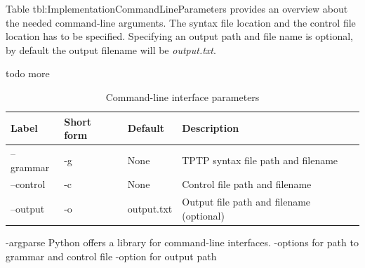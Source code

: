 Table \ac{tbl:ImplementationCommandLineParameters} provides an overview about the needed command-line arguments. The syntax file location and the control file location has to be specified. Specifying an output path and file name is optional, by default the output filename will be \textit{output.txt}.

todo more
\begin{table}[H]
\centering
\caption{Command-line interface parameters}
\begin{adjustbox}{width=1\textwidth, center=\textwidth}
\renewcommand{\arraystretch}{2}
\begin{tabular}{llll}
\textbf{Label} & \textbf{Short form} & \textbf{Default} & \textbf{Description}\\\hline
--grammar & -g & None & \ac{TPTP} syntax file path and filename\\
--control & -c & None &  Control file path and filename\\
--output & -o & output.txt & Output file path and filename (optional)
\end{tabular}
\end{adjustbox}
\label{tbl:ImplementationCommandLineParameters}
\end{table}

-argparse Python offers a library for command-line interfaces.
-options for path to grammar and control file
-option for output path
